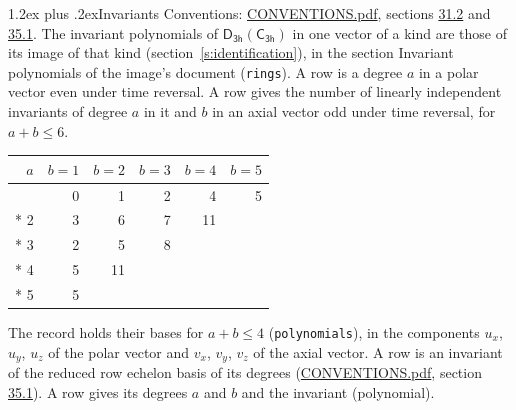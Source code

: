 \documentclass[10pt,a4paper]{article}
\makeatletter
\renewcommand\section{\@startsection{section}{1}{\z@}{-3ex plus -1ex minus -.2ex}%
  {1.2ex plus .2ex}{\normalfont\large\sffamily\bfseries\color{parttitle}}}
\numberwithin{equation}{section}
\newcommand{\grp}[1]{\mathsf{#1}}
\makeatother
\begin{document}
\section{Invariants}\label{s:invariants}
Conventions: \href{../../CONVENTIONS.pdf}{CONVENTIONS.pdf}, sections \href{../../CONVENTIONS.pdf\#conv.31.2}{31.2} and \href{../../CONVENTIONS.pdf\#conv.35.1}{35.1}.
The invariant polynomials of $\grp{D_{3h}}(\grp{C_{3h}})$ in one vector of a kind are those of its image of that kind (section~\ref{s:identification}), in the section Invariant polynomials of the image's document (\texttt{rings}).
\leavevmode\label{n:index.degree.polar}\label{n:index.degree.axial}A row is a degree $a$ in a polar vector even under time reversal. A row gives the number of linearly independent invariants of degree $a$ in it and $b$ in an axial vector odd under time reversal, for $a + b \le 6$.
{\small\begin{longtable}{@{}rrrrrr@{}}\toprule
$a$ & $b = 1$ & $b = 2$ & $b = 3$ & $b = 4$ & $b = 5$\\\midrule\endhead
\bottomrule\endfoot\endlastfoot
1 & 0 & 1 & 2 & 4 & 5\\*
2 & 3 & 6 & 7 & 11 & \\*
3 & 2 & 5 & 8 &  & \\*
4 & 5 & 11 &  &  & \\*
5 & 5 &  &  &  & \\
\bottomrule\end{longtable}}
\leavevmode\label{n:local.component.polar}\label{n:local.component.axial}The record holds their bases for $a + b \le 4$ (\texttt{polynomials}), in the components $u_{x}$, $u_{y}$, $u_{z}$ of the polar vector and $v_{x}$, $v_{y}$, $v_{z}$ of the axial vector. \label{n:head.polynomial}A row is an invariant of the reduced row echelon basis of its degrees (\href{../../CONVENTIONS.pdf}{CONVENTIONS.pdf}, section \href{../../CONVENTIONS.pdf\#conv.35.1}{35.1}). A row gives its degrees $a$ and $b$ and the invariant (polynomial).
\end{document}
